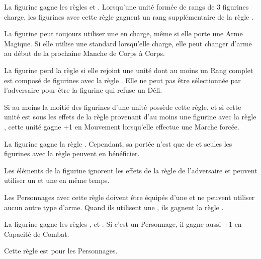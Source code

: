\armyspecialruleentry{\lanceformation}

La figurine gagne les règles \monstrousranks{} et \fightinextrarank{}. Lorsqu'une unité formée de rangs de 3 figurines charge, les figurines avec cette règle gagnent un rang supplémentaire de la règle \fightinextrarank{}. 

\armyspecialruleentry{\jousting}

La figurine peut toujours utiliser une \lance{} en charge, même si elle porte une Arme Magique. Si elle utilise une \lance{} standard lorsqu'elle charge, elle peut changer d'arme au début de la prochaine Manche de Corps à Corps.

\armyspecialruleentry{\beloved}

La figurine perd la règle \firstinrank{} si elle rejoint une unité dont au moins un Rang complet est composé de figurines avec la règle \lanceformation{}. Elle ne peut pas être sélectionnée par l'adversaire pour être la figurine qui refuse un Défi.

\armyspecialruleentry{\serfs}

Si au moins la moitié des figurines d'une unité possède cette règle, et si cette unité est sous les effets de la règle \inspiringpresence{} provenant d'au moins une figurine avec la règle \oathoffealty{}, cette unité gagne +1 en Mouvement lorsqu'elle effectue une Marche forcée.

\armyspecialruleentry{\oathoffealty}

La figurine gagne la règle \inspiringpresence{}. Cependant, sa portée n'est que de  et seules les figurines avec la règle \serfs{} peuvent en bénéficier.

\setlength{\columnseprule}{0.5pt}
\renewcommand{\columnseprulecolor}{\color{black!30}}
\begin{multicols}{2}\raggedcolumns
\armyspecialruleentry{\questingoath}

Les éléments de la figurine ignorent les effets de la règle \fear{} de l'adversaire et peuvent utiliser un \shield{} et une \gw{} en même temps.

\vspace*{5pt}
Les Personnages avec cette règle doivent être équipés d'une \gw{} et ne peuvent utiliser aucun autre type d'arme. Quand ils utilisent une \gw{}, ils gagnent la règle .

\columnbreak
\armyspecialruleentry{\grailoath}

La figurine gagne les règles \magicalattacks{}, \immunetopsychology{} et . Si c'est un Personnage, il gagne aussi +1 en Capacité de Combat.

\vspace*{5pt}
Cette règle est \oneofakind{} pour les Personnages.
\end{multicols}
\setlength{\columnseprule}{0pt}

